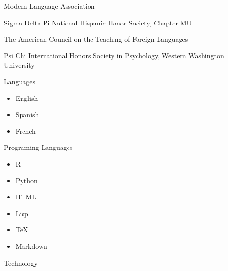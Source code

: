 \documentclass[11pt]{article}
\begin{document}
\bigskip 


\noindent Modern Language Association \\ \vspace{-0.1in}

\noindent Sigma Delta Pi National Hispanic Honor Society, Chapter MU \\ \vspace{-0.1in}

\noindent The American Council on the Teaching of Foreign Languages \\ \vspace{-0.1in}

\noindent Psi Chi International Honors Society in Psychology, Western Washington University


\bigskip 

 
\noindent Languages \vspace{-0.1in}
\begin{itemize}
  \item English \vspace{-0.1in}
  \item Spanish \vspace{-0.1in}
  \item French
\end{itemize}

\noindent Programing Languages \vspace{-0.1in}
\begin{itemize}
  \item R \vspace{-0.1in}
  \item Python \vspace{-0.1in}
  \item HTML \vspace{-0.1in}
  \item Lisp \vspace{-0.1in}
  \item TeX \vspace{-0.1in}
  \item Markdown
\end{itemize}

\noindent Technology \vspace{-0.1in}
\end{document}
